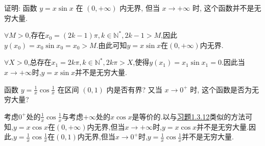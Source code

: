 \begin{exercise}[1.3.12]\label{exe:1.3.12}
    证明: 函数 $y=x\sin x$ 在 $(0, +\infty)$ 内无界, 但当 $x \to +\infty$ 时, 这个函数并不是无穷大量.
\end{exercise}

\begin{solution}
    $\forall M > 0$,存在$x_0 = (2k-1) \pi, k \in \mathbb{N}^*, 2k - 1 > M$,因此$y(x_0) = x_0 \sin x_0 = x_0 > M$.由此可知$y = x \sin x$在$(0, +\infty)$内无界.

    $\forall X > 0$,总存在$x_1 = 2k \pi, k \in \mathbb{N}^*, 2k \pi > X$,使得$y(x_1) = x_1 \sin x_1 = 0$.因此当$x \to +\infty$时,$y = x \sin x$并不是无穷大量.
\end{solution}

\begin{exercise}[1.3.13]
    函数 $y = \frac{1}{x}\cos\frac{1}{x}$ 在区间 $(0,1)$ 内是否有界? 又当 $x \to 0^+$ 时, 这个函数是否为无穷大量?
\end{exercise}

\begin{solution}
    考虑$0^+$处的$\frac{1}{x} \cos \frac{1}{x}$与考虑$+\infty$处的$x \cos x$是等价的.以与\hyperref[exe:1.3.12]{习题1.3.12}类似的方法可知,$y = x \cos x$在$(0, +\infty)$内无界,但当$x \to +\infty$时,$y = x \cos x$并不是无穷大量.因此,$y = \frac{1}{x} \cos \frac{1}{x}$在$(0, 1)$内无界,但当$x \to 0^+$时,$y = \frac{1}{x} \cos \frac{1}{x}$并不是无穷大量.
\end{solution}

